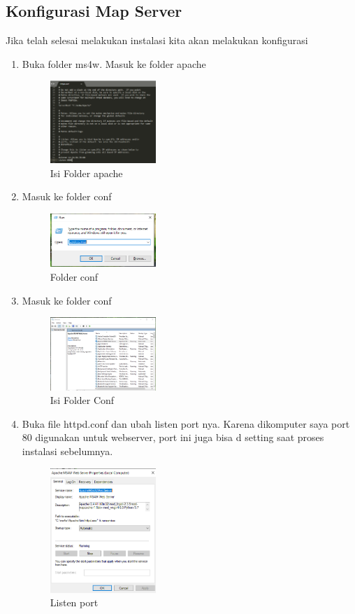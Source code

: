 \subsection{Konfigurasi Map Server}
Jika telah selesai melakukan instalasi kita akan melakukan konfigurasi
\begin{enumerate}
  \item Buka folder ms4w. Masuk ke folder apache
  \hfill\break
    \begin{figure}[H]
		\includegraphics[width=4cm]{figures/1174005/4/03.png}
		\centering
		\caption{Isi Folder apache}
    \end{figure}


  \item Masuk ke folder conf
  \hfill\break
    \begin{figure}[H]
		\includegraphics[width=4cm]{figures/1174005/4/04.png}
		\centering
		\caption{Folder conf}
    \end{figure}
  \item Masuk ke folder conf
  \hfill\break
    \begin{figure}[H]
		\includegraphics[width=4cm]{figures/1174005/4/05.png}
		\centering
		\caption{Isi Folder Conf}
    \end{figure}

  \item Buka file httpd.conf dan ubah listen port nya. Karena dikomputer saya port 80 digunakan untuk webserver, port ini juga bisa d setting saat proses instalasi sebelumnya.
  \hfill\break
    \begin{figure}[H]
		\includegraphics[width=4cm]{figures/1174005/4/06.png}
		\centering
		\caption{Listen port}
    \end{figure}


\end{enumerate}
